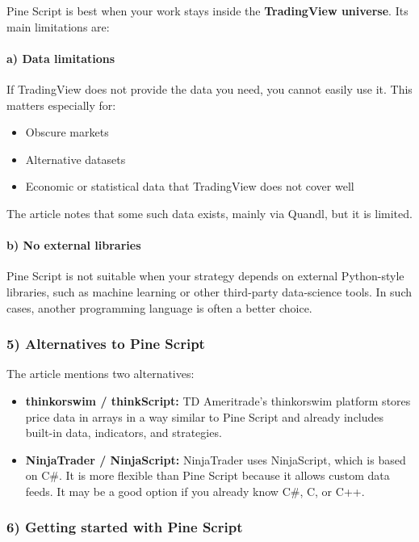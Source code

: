 \documentclass[12pt,openany]{book}
\begin{document}
Pine Script is best when your work stays inside the \textbf{TradingView universe}. Its main limitations are:

\paragraph{a) Data limitations}

If TradingView does not provide the data you need, you cannot easily use it. This matters especially for:

\begin{itemize}[leftmargin=*]
    \item Obscure markets
    \item Alternative datasets
    \item Economic or statistical data that TradingView does not cover well
\end{itemize}

The article notes that some such data exists, mainly via Quandl, but it is limited.

\paragraph{b) No external libraries}

Pine Script is not suitable when your strategy depends on external Python-style libraries, such as machine learning or other third-party data-science tools. In such cases, another programming language is often a better choice.

\subsubsection{5) Alternatives to Pine Script}

The article mentions two alternatives:

\begin{itemize}[leftmargin=*]
    \item \textbf{thinkorswim / thinkScript:} TD Ameritrade's thinkorswim platform stores price data in arrays in a way similar to Pine Script and already includes built-in data, indicators, and strategies.
    \item \textbf{NinjaTrader / NinjaScript:} NinjaTrader uses NinjaScript, which is based on C\#. It is more flexible than Pine Script because it allows custom data feeds. It may be a good option if you already know C\#, C, or C++.
\end{itemize}

\subsubsection{6) Getting started with Pine Script}
\end{document}
